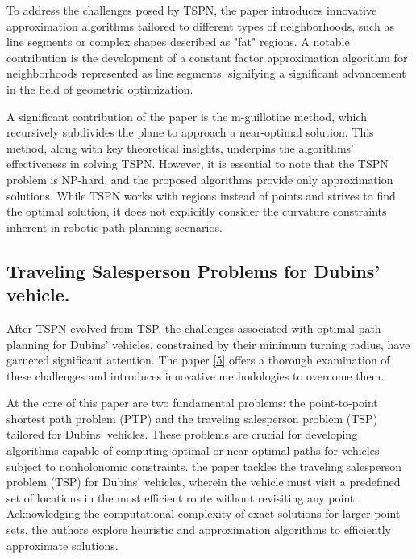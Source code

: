 \vspace{3mm}

To address the challenges posed by TSPN, the paper introduces innovative approximation algorithms tailored to different types of neighborhoods, such as line segments or complex shapes described as "fat" regions. A notable contribution is the development of a constant factor approximation algorithm for neighborhoods represented as line segments, signifying a significant advancement in the field of geometric optimization.

\vspace{3mm}

A significant contribution of the paper is the m-guillotine method, which recursively subdivides the plane to approach a near-optimal solution. This method, along with key theoretical insights, underpins the algorithms' effectiveness in solving TSPN. However, it is essential to note that the TSPN problem is NP-hard, and the proposed algorithms provide only approximation solutions. While TSPN works with regions instead of points and strives to find the optimal solution, it does not explicitly consider the curvature constraints inherent in robotic path planning scenarios.











\subsection{Traveling Salesperson Problems for Dubins’ vehicle.}



After TSPN evolved from TSP, the challenges associated with optimal path planning for Dubins' vehicles, constrained by their minimum turning radius, have garnered significant attention. The paper \hyperlink{cite.TSP_with_dubins}{[5]} offers a thorough examination of these challenges and introduces innovative methodologies to overcome them.

\vspace{3mm}


At the core of this paper are two fundamental problems: the point-to-point shortest path problem (PTP) and the traveling salesperson problem (TSP) tailored for Dubins’ vehicles. These problems are crucial for developing algorithms capable of computing optimal or near-optimal paths for vehicles subject to nonholonomic constraints. the paper tackles the traveling salesperson problem (TSP) for Dubins’ vehicles, wherein the vehicle must visit a predefined set of locations in the most efficient route without revisiting any point. Acknowledging the computational complexity of exact solutions for larger point sets, the authors explore heuristic and approximation algorithms to efficiently approximate solutions.

